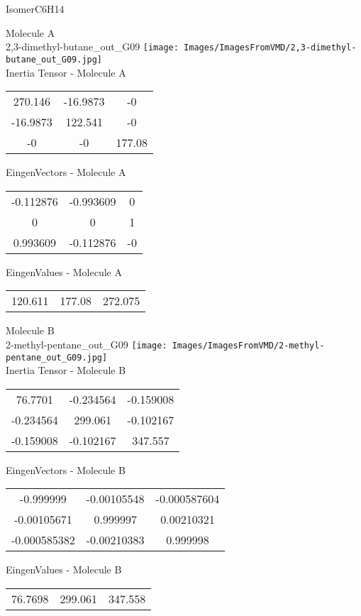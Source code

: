 \vtab[-2cm]
\begin{center}
{\large IsomerC6H14}
\end{center}
\begin{multicols}{2}
\begin{center}
Molecule A \\ 
2,3-dimethyl-butane\_out\_G09
\texttt{[image: Images/ImagesFromVMD/2,3-dimethyl-butane\_out\_G09.jpg]}
\\
Inertia Tensor - Molecule A \\
\vtab
\begin{tabular}{|c c c|}
270.146	 & 	-16.9873	 & 	-0	 \\
-16.9873	 & 	122.541	 & 	-0	 \\
-0	 & 	-0	 & 	177.08
\end{tabular}

\vtab
 EingenVectors - Molecule A     \\
\vtab
\begin{tabular}{|c c c|}
-0.112876	 & 	-0.993609	 & 	0	 \\
0	 & 	0	 & 	1	 \\
0.993609	 & 	-0.112876	 & 	-0
\end{tabular}

\vtab
 EingenValues - Molecule A     \\
\vtab
\begin{tabular}{|c c c|}
120.611	 & 	177.08	 & 	272.075
\end{tabular}
\columnbreak

Molecule B \\ 
2-methyl-pentane\_out\_G09
\texttt{[image: Images/ImagesFromVMD/2-methyl-pentane\_out\_G09.jpg]}
\\
Inertia Tensor - Molecule B \\
\vtab
\begin{tabular}{|c c c|}
76.7701	 & 	-0.234564	 & 	-0.159008	 \\
-0.234564	 & 	299.061	 & 	-0.102167	 \\
-0.159008	 & 	-0.102167	 & 	347.557
\end{tabular}

\vtab
 EingenVectors - Molecule B     \\
\vtab
\begin{tabular}{|c c c|}
-0.999999	 & 	-0.00105548	 & 	-0.000587604	 \\
-0.00105671	 & 	0.999997	 & 	0.00210321	 \\
-0.000585382	 & 	-0.00210383	 & 	0.999998
\end{tabular}

\vtab
 EingenValues - Molecule B     \\
\vtab
\begin{tabular}{|c c c|}
76.7698	 & 	299.061	 & 	347.558
\end{tabular}

\end{center}
\end{multicols}
